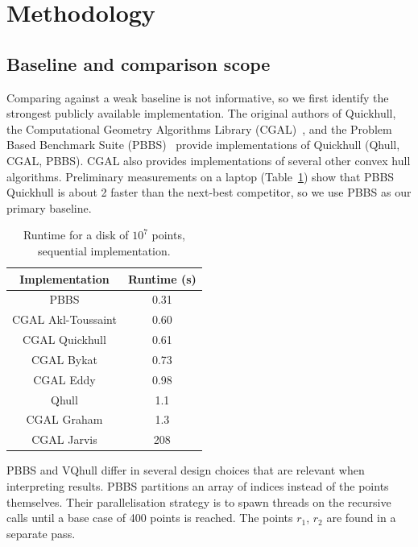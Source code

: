 \documentclass[11pt,a4paper]{article}
\begin{document}
\section{Methodology}\label{sec:methodology}

\subsection{Baseline and comparison scope}
Comparing against a weak baseline is not informative, so we first identify the strongest publicly available implementation.
The original authors of Quickhull, the Computational Geometry Algorithms Library (CGAL)~\cite{cgal2024manual}, and the
Problem Based Benchmark Suite (PBBS)~\cite{anderson2022problem} provide implementations of Quickhull (Qhull, CGAL, PBBS).
CGAL also provides implementations of several other convex hull algorithms.
Preliminary measurements on a laptop (Table~\ref{tab:reference}) show that PBBS Quickhull is about \qty{2}{\times} faster than the next-best competitor, so we use PBBS as our primary baseline.

\begin{table}[ht]
  \centering
  \begin{tabular}{cc}
    \toprule
    Implementation & Runtime (\si{\second}) \\
    \midrule
    PBBS               & 0.31 \\
    CGAL Akl-Toussaint & 0.60 \\
    CGAL Quickhull     & 0.61 \\
    CGAL Bykat         & 0.73 \\
    CGAL Eddy          & 0.98 \\
    Qhull              & 1.1 \\
    CGAL Graham        & 1.3 \\
    CGAL Jarvis        & 208 \\
    \bottomrule
  \end{tabular}%
  \caption{Runtime for a disk of $10^7$ points, sequential implementation.}%
  \label{tab:reference}%
\end{table}

PBBS and VQhull differ in several design choices that are relevant when interpreting results.
PBBS partitions an array of indices instead of the points themselves.
Their parallelisation strategy is to spawn threads on the recursive calls until a base case of \num{400} points is reached.
The points $r_1$, $r_2$ are found in a separate pass.
\end{document}
